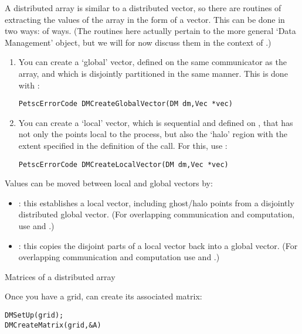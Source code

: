 A distributed array is similar to a distributed vector, so there are routines of
extracting the values of the array in the form of a vector. This can be done in two ways:
of ways.
%
(The routines here actually pertain to the more general  `Data Management'
object, but we will for now discuss them in the context of .)
%
\begin{enumerate}
\item You can create a `global' vector, defined on the same communicator as the array,
  and which is disjointly partitioned in the same manner. This is done with
  :
\begin{lstlisting}
PetscErrorCode DMCreateGlobalVector(DM dm,Vec *vec)    
\end{lstlisting}
\item You can create a `local' vector,
  which is sequential and defined on ,
  that has not only the points local to the process, but also the `halo' region
  with the extent specified in the definition of the  call.
  For this, use :
\begin{lstlisting}
PetscErrorCode DMCreateLocalVector(DM dm,Vec *vec)
\end{lstlisting}
\end{enumerate}

Values can be moved between local and global vectors by:
\begin{itemize}
\item {}: this establishes a local vector,
  including ghost/halo points from a disjointly distributed global vector.
  (For overlapping communication and computation, use
   and .)
\item {}: this copies the disjoint parts
  of a local vector back into a global vector.
  (For overlapping communication and computation use
   and .)
\end{itemize}

 {Matrices of a distributed array}

Once you have a grid, can create its associated matrix:
\begin{lstlisting}
DMSetUp(grid);
DMCreateMatrix(grid,&A)
\end{lstlisting}

